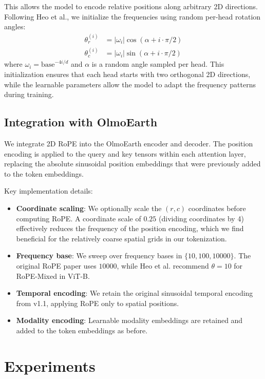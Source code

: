 \documentclass{article}
\begin{document}
This allows the model to encode relative positions along arbitrary 2D directions. Following Heo et al., we initialize the frequencies using random per-head rotation angles:
\begin{align}
    \theta_r^{(i)} &= |\omega_i| \cos(\alpha + i \cdot \pi/2) \\
    \theta_c^{(i)} &= |\omega_i| \sin(\alpha + i \cdot \pi/2)
\end{align}
where $\omega_i = \text{base}^{-4i/d}$ and $\alpha$ is a random angle sampled per head. This initialization ensures that each head starts with two orthogonal 2D directions, while the learnable parameters allow the model to adapt the frequency patterns during training.

\subsection{Integration with OlmoEarth}

We integrate 2D RoPE into the OlmoEarth encoder and decoder. The position encoding is applied to the query and key tensors within each attention layer, replacing the absolute sinusoidal position embeddings that were previously added to the token embeddings.

Key implementation details:
\begin{itemize}
    \item \textbf{Coordinate scaling}: We optionally scale the $(r, c)$ coordinates before computing RoPE. A coordinate scale of $0.25$ (dividing coordinates by 4) effectively reduces the frequency of the position encoding, which we find beneficial for the relatively coarse spatial grids in our tokenization.
    
    \item \textbf{Frequency base}: We sweep over frequency bases in $\{10, 100, 10000\}$. The original RoPE paper uses $10000$, while Heo et al. recommend $\theta = 10$ for RoPE-Mixed in ViT-B.
    
    \item \textbf{Temporal encoding}: We retain the original sinusoidal temporal encoding from v1.1, applying RoPE only to spatial positions.
    
    \item \textbf{Modality encoding}: Learnable modality embeddings are retained and added to the token embeddings as before.
\end{itemize}

\section{Experiments}
\label{sec:experiments}
\end{document}
